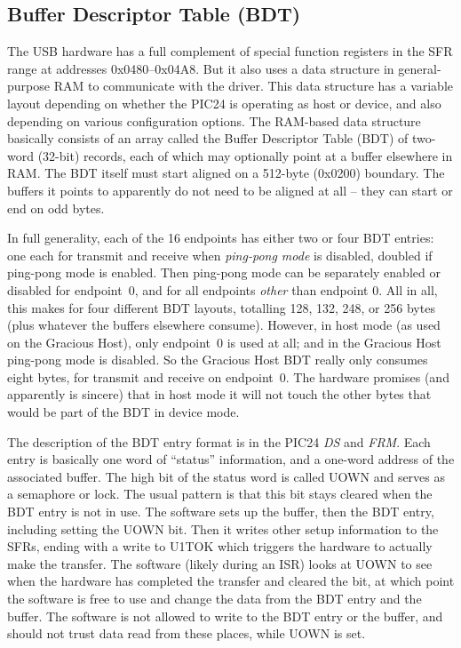 \subsection{Buffer Descriptor Table (BDT)}

The USB hardware has a full complement of special function registers in the
SFR range at addresses 0x0480--0x04A8.  But it also uses a data structure in
general-purpose RAM to communicate with the driver.  This data structure has
a variable layout depending on whether the PIC24 is operating as host or
device, and also depending on various configuration options.  The RAM-based
data structure basically consists of an array called the Buffer Descriptor
Table (BDT) of two-word (32-bit) records, each of which may optionally point
at a buffer elsewhere in RAM.  The BDT itself must start aligned on a
512-byte (0x0200) boundary.  The buffers it points to apparently do not need
to be aligned at all -- they can start or end on odd bytes.

In full generality, each of the 16 endpoints has either two or four BDT
entries: one each for transmit and receive when \emph{ping-pong mode} is
disabled, doubled if ping-pong mode is enabled.  Then ping-pong mode can be
separately enabled or disabled for endpoint~0, and for all endpoints
\emph{other} than endpoint 0.  All in all, this makes for four different BDT
layouts, totalling 128, 132, 248, or 256 bytes (plus whatever the buffers
elsewhere consume).  However, in host mode (as used on the Gracious Host),
only endpoint~0 is used at all; and in the Gracious Host ping-pong mode is
disabled.  So the Gracious Host BDT really only consumes eight bytes, for
transmit and receive on endpoint~0.  The hardware promises (and apparently
is sincere) that in host mode it will not touch the other bytes that would
be part of the BDT in device mode.

The description of the BDT entry format is in the PIC24 \emph{DS} and
\emph{FRM}.  Each entry is basically one word of ``status'' information, and
a one-word address of the associated buffer.  The high bit of the status
word is called UOWN and serves as a semaphore or lock.  The usual pattern is
that this bit stays cleared when the BDT entry is not in use.  The software
sets up the buffer, then the BDT entry, including setting the UOWN bit. 
Then it writes other setup information to the SFRs, ending with a write to
U1TOK which triggers the hardware to actually make the transfer.  The
software (likely during an ISR) looks at UOWN to see when the hardware has
completed the transfer and cleared the bit, at which point the software is
free to use and change the data from the BDT entry and the buffer.  The
software is not allowed to write to the BDT entry or the buffer, and should
not trust data read from these places, while UOWN is set.

